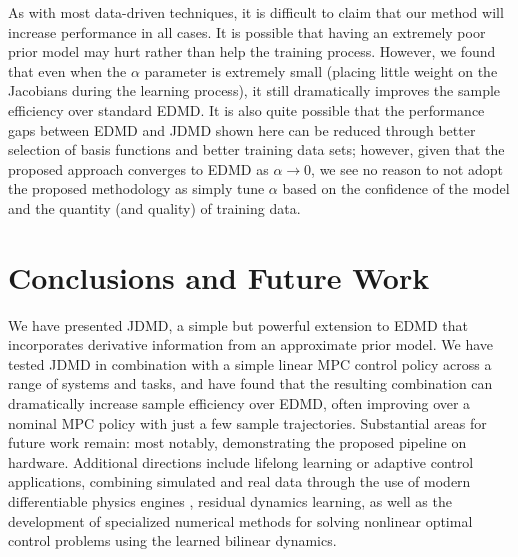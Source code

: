 \documentclass{article}
\begin{document}
As with most data-driven techniques, it is difficult to claim that our
method will increase performance in all cases. It is possible that having an extremely poor
prior model may hurt rather than help the training process. However, we found that even
when the $\alpha$ parameter is extremely small (placing little weight on the Jacobians 
during the learning process), it still dramatically improves the sample efficiency over 
standard EDMD. It is also quite possible that the performance gaps between EDMD and JDMD
shown here can be reduced through better selection of basis functions and better training
data sets; however, given that the proposed approach converges to EDMD as $\alpha
\rightarrow 0$, we see no reason to not adopt the proposed methodology as simply tune
$\alpha$ based on the confidence of the model and the quantity (and quality) of training
data.


\section{Conclusions and Future Work} \label{sec:conclusion}

We have presented JDMD, a simple but powerful extension to EDMD that incorporates derivative
information from an approximate prior model. We have tested JDMD in combination with 
a simple linear MPC control policy across a range of systems and tasks, and have found that the
resulting combination can dramatically increase sample efficiency over EDMD, often improving over a
nominal MPC policy with just a few sample trajectories. Substantial areas for future work
remain: most notably, demonstrating the proposed pipeline on hardware. Additional directions
include lifelong learning or adaptive control applications, combining simulated and real
data through the use of modern differentiable physics engines \cite{Howell2022,Todorov2012},
residual dynamics learning, as well as the development of specialized numerical methods for
solving nonlinear optimal control problems using the learned bilinear dynamics.


\end{document}
